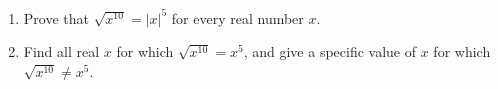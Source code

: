 \begin{enumerate}
\item[(a)] Prove that $\sqrt{x^{10}}=|x|^5$ for every real number $x$.
\item[(b)] Find all real $x$ for which $\sqrt{x^{10}}=x^5$, and give a specific value of $x$ for which $\sqrt{x^{10}}\ne x^5$.
\end{enumerate}
